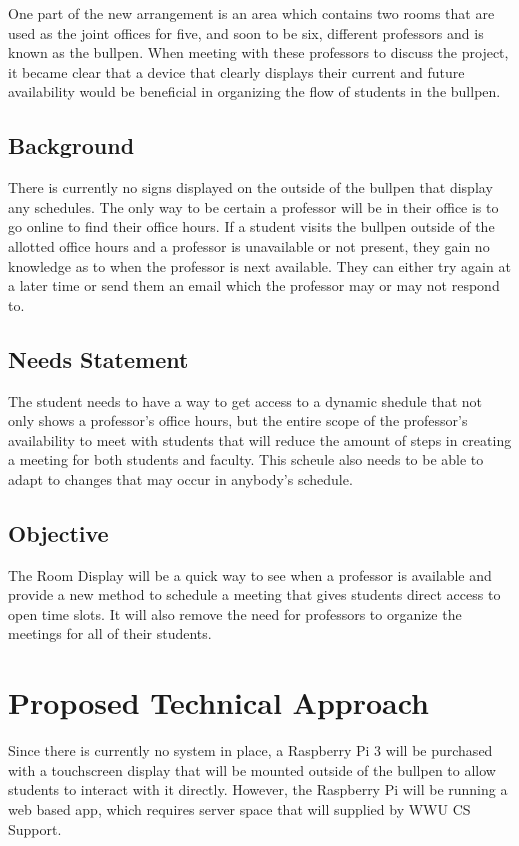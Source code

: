\documentclass[12pt]{article}
\begin{document}
One part of the new arrangement is an area which contains two rooms that are used as the joint offices for five, and soon to be six, different professors and is known as the bullpen. When meeting with these professors to discuss the project, it became clear that a device that clearly displays their current and future availability would be beneficial in organizing the flow of students in the bullpen.

\subsection{Background}

There is currently no signs displayed on the outside of the bullpen that display any schedules. The only way to be certain a professor will be in their office is to go online to find their office hours. If a student visits the bullpen outside of the allotted office hours and a professor is unavailable or not present, they gain no knowledge as to when the professor is next available. They can either try again at a later time or send them an email which the professor may or may not respond to.

\subsection{Needs Statement}
The student needs to have a way to get access to a dynamic shedule that not only shows a professor's office hours, but the entire scope of the professor's availability to meet with students that will reduce the amount of steps in creating a meeting for both students and faculty. This scheule also needs to be able to adapt to changes that may occur in anybody's schedule.  


\subsection{Objective}

The Room Display will be a quick way to see when a professor is available and provide a new method to schedule a meeting that gives students direct access to open time slots. It will also remove the need for professors to organize the meetings for all of their students.

\section{Proposed Technical Approach}
Since there is currently no system in place, a Raspberry Pi 3 will be purchased with a touchscreen display that will be mounted outside of the bullpen to allow students to interact with it directly. However, the Raspberry Pi will be running a web based app, which requires server space that will supplied by WWU CS Support. 
\end{document}

